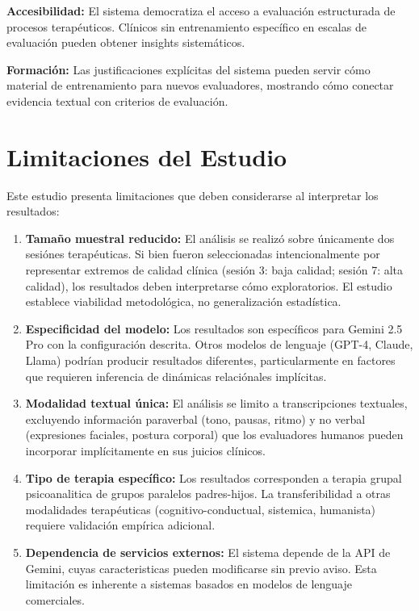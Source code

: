 \documentclass[12pt,a4paper,twoside]{book}
\begin{document}
\textbf{Accesibilidad:} El sistema democratiza el acceso a evaluación estructurada de procesos terapéuticos. Clínicos sin entrenamiento específico en escalas de evaluación pueden obtener insights sistemáticos.

\textbf{Formación:} Las justificaciones explícitas del sistema pueden servir cómo material de entrenamiento para nuevos evaluadores, mostrando cómo conectar evidencia textual con criterios de evaluación.

\section{Limitaciones del Estudio}

Este estudio presenta limitaciones que deben considerarse al interpretar los resultados:

\begin{enumerate}
    \item \textbf{Tamaño muestral reducido:} El análisis se realizó sobre únicamente dos sesiónes terapéuticas. Si bien fueron seleccionadas intencionalmente por representar extremos de calidad clínica (sesión 3: baja calidad; sesión 7: alta calidad), los resultados deben interpretarse cómo exploratorios. El estudio establece viabilidad metodológica, no generalización estadística.
    
    \item \textbf{Especificidad del modelo:} Los resultados son específicos para Gemini 2.5 Pro con la configuración descrita. Otros modelos de lenguaje (GPT-4, Claude, Llama) podrían producir resultados diferentes, particularmente en factores que requieren inferencia de dinámicas relaciónales implícitas.
    
    \item \textbf{Modalidad textual única:} El análisis se limito a transcripciones textuales, excluyendo información paraverbal (tono, pausas, ritmo) y no verbal (expresiones faciales, postura corporal) que los evaluadores humanos pueden incorporar implícitamente en sus juicios clínicos.
    
    \item \textbf{Tipo de terapia específico:} Los resultados corresponden a terapia grupal psicoanalitica de grupos paralelos padres-hijos. La transferibilidad a otras modalidades terapéuticas (cognitivo-conductual, sistemica, humanista) requiere validación empírica adicional.
    
    \item \textbf{Dependencia de servicios externos:} El sistema depende de la API de Gemini, cuyas caracteristicas pueden modificarse sin previo aviso. Esta limitación es inherente a sistemas basados en modelos de lenguaje comerciales.
\end{enumerate}
\end{document}
